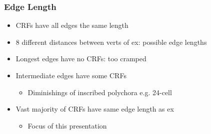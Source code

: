 \documentclass{beamer}
\begin{document}
\begin{frame}
  \frametitle{Edge Length}
  \begin{itemize}
  \item
    CRFs have all edges the same length
  \item
    8 different distances between verts of ex: possible edge lengths
  \item
    Longest edges have no CRFs: too cramped
  \item
    Intermediate edges have some CRFs
    \begin{itemize}
    \item
      Diminishings of inscribed polychora e.g. 24-cell
    \end{itemize}
  \item
    Vast majority of CRFs have same edge length as ex
    \begin{itemize}
    \item
      Focus of this presentation
    \end{itemize}
  \end{itemize}
\end{frame}
\end{document}
